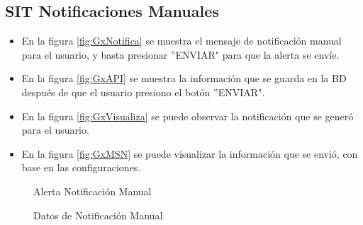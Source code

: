 \subsection{SIT Notificaciones Manuales}

\begin{itemize}
	\item En la figura \ref{fig:GxNotifica} se muestra el mensaje de notificación manual para el usuario, y basta presionar ''ENVIAR" para que la alerta se envíe.
	\item En la figura \ref{fig:GxAPI} se muestra la información que se guarda en la BD después de que el usuario presiono el botón ''ENVIAR".
	\item En la figura \ref{fig:GxVisualiza} se puede observar la notificación que se generó para el usuario.
	\item En la figura \ref{fig:GxMSN} se puede visualizar la información que se envió, con base en las configuraciones.
\end{itemize}


\begin{figure}[htbp!]
	\centering
	\caption{Alerta Notificación Manual}
	\label{fig:ManNotifica}
\end{figure}

\begin{figure}[htbp!]
	\centering
	\caption{Datos de Notificación Manual}
	\label{fig:ManAPI}
\end{figure}

